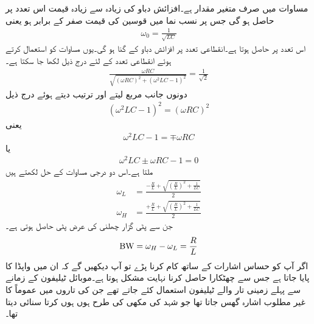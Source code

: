 مساوات  میں صرف  متغیر مقدار ہے۔افزائش دباو کی زیادہ سے زیادہ قیمت  اس تعدد  پر حاصل ہو گی جس پر نسب نما میں قوسین کی قیمت صفر کے برابر ہو یعنی
\begin{align}
\omega_0=\frac{1}{\sqrt{LC}}
\end{align} 
اس تعدد پر  حاصل ہوتا ہے۔انقطاعی تعدد پر افزائش دباو  کے  گنا ہو گی۔یوں مساوات  کو استعمال کرتے ہوئے انقطاعی تعدد کے لئے درج ذیل لکھا جا سکتا ہے۔
\begin{align*}
\frac{\omega RC}{\sqrt{(\omega RC)^2+(\omega^2 LC-1)^2}}=\frac{1}{\sqrt{2}}
\end{align*}
دونوں جانب مربع لیتے اور ترتیب دیتے ہوئے درج ذیل
\begin{align*}
(\omega^2 LC-1)^2=(\omega RC)^2
\end{align*}
یعنی
\begin{align*}
\omega^2 LC-1=\mp \omega RC
\end{align*}
یا
\begin{align*}
\omega^2 LC\pm \omega RC-1=0
\end{align*}
ملتا ہے۔اس دو درجی مساوات کے حل لکھتے ہیں
\begin{align}
\omega_L&=\frac{-\frac{R}{L}+\sqrt{\left(\frac{R}{L}\right)^2+\frac{1}{LC}}}{2}\\
\omega_H&=\frac{+\frac{R}{L}+\sqrt{\left(\frac{R}{L}\right)^2+\frac{1}{LC}}}{2}
\end{align}
جن سے پٹی گزار چھلنی کی عرض پٹی  حاصل ہوتی ہے۔
\begin{align}
{\ensuremath{{\textup{BW}}}}=\omega_H-\omega_L=\frac{R}{L}
\end{align}
اگر آپ کو حساس اشارات کے ساتھ کام کرنا پڑے تو آپ دیکھیں گے کہ ان میں واپڈا کا  پایا جاتا ہے جس سے چھٹکارا حاصل کرنا نہایت مشکل ہوتا ہے۔موبائل ٹیلیفون کے زمانے سے پہلے زمینی تار والے ٹیلیفون استعمال کئے جاتے تھے جن کی تاروں میں عموماً  کا غیر مطلوب اشارہ گھس جاتا تھا جو شہد کی مکھی کی طرح ہوں ہوں کرتا سنائی دیتا تھا۔

